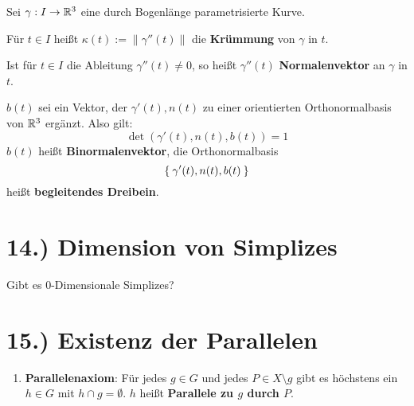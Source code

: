 \documentclass[a5paper,oneside]{scrbook}
\begin{document}
\begin{definition}%
    Sei $\gamma: I \rightarrow \mathbb{R}^3$ eine durch Bogenlänge parametrisierte
    Kurve.

    \begin{defenum}
        \item Für $t \in I$ heißt $\kappa(t) := \|\gamma''(t)\|$ die
              \textbf{Krümmung} von $\gamma$ in $t$.
        \item Ist für $t \in I$ die Ableitung $\gamma''(t) \neq 0$,
              so heißt $\gamma''(t)$ \textbf{Normalenvektor}
              an $\gamma$ in $t$.
        \item \label{def:16.4c} $b(t)$ sei ein Vektor, der $\gamma'(t), n(t)$
              zu einer orientierten Orthonormalbasis von $\mathbb{R}^3$ ergänzt.
              Also gilt:
              \[\det(\gamma'(t), n(t), b(t)) = 1\]
              $b(t)$ heißt \textbf{Binormalenvektor},
              die Orthonormalbasis 
              \[\Set{\gamma'(t), n(t), b(t)}\]
              heißt \textbf{begleitendes Dreibein}.
    \end{defenum}
\end{definition}


\section*{14.) Dimension von Simplizes}
Gibt es 0-Dimensionale Simplizes?

\section*{15.) Existenz der Parallelen}
\begin{definition}%
    \begin{enumerate}[label=§\arabic*),ref=§\arabic*,start=5]
        \item \label{axiom:5}\textbf{Parallelenaxiom}:
            Für jedes $g \in G$ und jedes
            $P \in X \setminus g$ gibt es höchstens ein $h \in G$ mit
            $h \cap g = \emptyset$. $h$ heißt \textbf{Parallele zu $g$ durch $P$}.
    \end{enumerate}
\end{definition}
\end{document}
